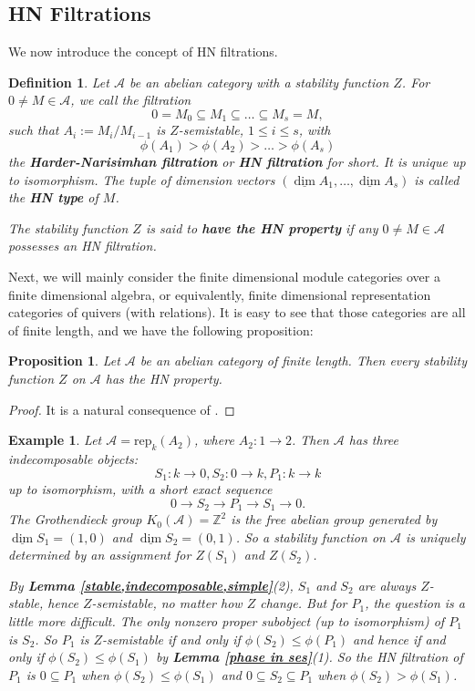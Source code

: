 \documentclass[a4paper,12pt]{amsart}
\newtheorem{definition}[theorem]{Definition}
\newtheorem{proposition}[theorem]{Proposition}
\newtheorem{example}[theorem]{Example}
\newcommand{\rep}{\mathrm{rep}}
\newcommand{\udv}{\underline{\dim}}
\begin{document}
\subsection{HN Filtrations}
We now introduce the concept of HN filtrations.
\begin{definition}\label{HN filtration}
    Let $\mathcal{A}$ be an abelian category with a stability function $Z$. For $0\neq M\in\mathcal{A}$, we call the filtration
    \[0=M_0\subseteq M_1\subseteq\dots\subseteq M_s=M,\]
    such that $A_i:=M_i/M_{i-1}$ is $Z$-semistable, $1\leqslant i\leqslant s$, with
    \[\phi(A_1)>\phi(A_2)>\dots>\phi(A_s)\]
    the \textbf{Harder-Narisimhan filtration} or \textbf{HN filtration} for short. It is unique up to isomorphism. The tuple of dimension vectors $(\udv A_1,\dots,\udv A_s)$ is called the \textbf{HN type} of $M$.

    The stability function $Z$ is said to \textbf{have the HN property} if any $0\neq M\in\mathcal{A}$ possesses an HN filtration.
\end{definition}
Next, we will mainly consider the finite dimensional module categories over a finite dimensional algebra, or equivalently, finite dimensional representation categories of quivers (with relations). It is easy to see that those categories are all of finite length, and we have the following proposition:
\begin{proposition}
    Let $\mathcal{A}$ be an abelian category of finite length. Then every stability function $Z$ on $\mathcal{A}$ has the HN property.
\end{proposition}
\begin{proof}
    It is a natural consequence of \cite[Proposition 2.4]{Bri2002}.
\end{proof}
\begin{example}\label{A2}
    Let $\mathcal{A}=\rep_k(A_2)$, where $A_2:1\rightarrow 2$. Then $\mathcal{A}$ has three indecomposable objects:
    \[S_1:k\rightarrow0,S_2:0\rightarrow k, P_1:k\rightarrow k\]
    up to isomorphism, with a short exact sequence
    \[0\rightarrow S_2\rightarrow P_1\rightarrow S_1\rightarrow0.\]
    The Grothendieck group $K_0(\mathcal{A})=\mathbb{Z}^2$ is the free abelian group generated by $\udv S_1=(1,0)$ and $\udv S_2=(0,1)$. So a stability function on $\mathcal{A}$ is uniquely determined by an assignment for $Z(S_1)$ and $Z(S_2)$. 
    
    By \textbf{Lemma \ref{stable,indecomposable,simple}}(2), $S_1$ and $S_2$ are always $Z$-stable, hence $Z$-semistable, no matter how $Z$ change. But for $P_1$, the question is a little more difficult. The only nonzero proper subobject (up to isomorphism) of $P_1$ is $S_2$. So $P_1$ is $Z$-semistable if and only if $\phi(S_2)\leqslant \phi(P_1)$ and hence if and only if $\phi(S_2)\leqslant \phi(S_1)$ by \textbf{Lemma \ref{phase in ses}}(1). So the HN filtration of $P_1$ is $0\subseteq P_1$ when $\phi(S_2)\leqslant\phi(S_1)$ and $0\subseteq S_2\subseteq P_1$ when $\phi(S_2)>\phi(S_1)$.
\end{example}
\end{document}
